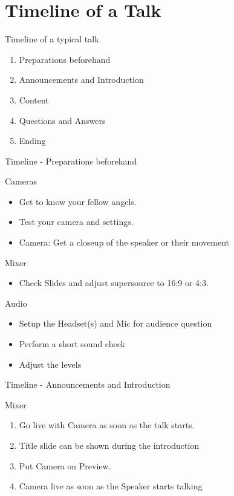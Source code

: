 \documentclass[aspectratio=169]{beamer}
\begin{document}
\section{Timeline of a Talk}

\begin{frame}{Timeline of a typical talk}
	\begin{enumerate}
		\item Preparations beforehand
		\item Announcements and Introduction
		\item Content
		\item Questions and Answers
		\item Ending
	\end{enumerate}
\end{frame}

\begin{frame}{Timeline - Preparations beforehand}
	\begin{block}{Cameras}
		\begin{itemize}
			\item Get to know your fellow angels.
			\item Test your camera and settings.
			\item Camera: Get a closeup of the speaker or their movement
		\end{itemize}
	\end{block}
	\begin{block}{Mixer}
		\begin{itemize}
			\item Check Slides and adjust supersource to 16:9 or 4:3.
		\end{itemize}
	\end{block}
	\begin{block}{Audio}
	\begin{itemize}
		\item Setup the Headset(s) and Mic for audience question
		\item Perform a short sound check
		 \item Adjust the levels
	\end{itemize}
\end{block}
\end{frame}

\begin{frame}{Timeline - Announcements and Introduction}
	
	\begin{block}{Mixer}
		\begin{enumerate}
			\item Go live with Camera as soon as the talk starts.
			\item Title slide can be shown during the introduction 
			\item Put Camera  on Preview.
			\item Camera live as soon as the Speaker starts talking
		\end{enumerate}
	\end{block}
\end{frame}
\end{document}
